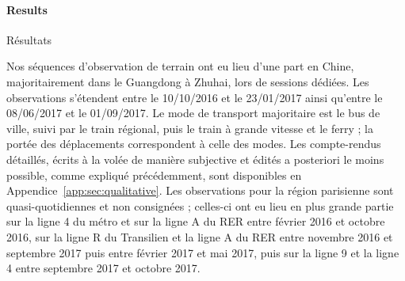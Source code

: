 \paragraph{Results}{Résultats}

Nos séquences d'observation de terrain ont eu lieu d'une part en Chine, majoritairement dans le Guangdong à Zhuhai, lors de sessions dédiées. Les observations s'étendent entre le 10/10/2016 et le 23/01/2017 ainsi qu'entre le 08/06/2017 et le 01/09/2017. Le mode de transport majoritaire est le bus de ville, suivi par le train régional, puis le train à grande vitesse et le ferry ; la portée des déplacements correspondent à celle des modes. Les compte-rendus détaillés, écrits à la volée de manière subjective et édités a posteriori le moins possible, comme expliqué précédemment, sont disponibles en Appendice~\ref{app:sec:qualitative}. Les observations pour la région parisienne sont quasi-quotidiennes et non consignées ; celles-ci ont eu lieu en plus grande partie sur la ligne 4 du métro et sur la ligne A du RER entre février 2016 et octobre 2016, sur la ligne R du Transilien et la ligne A du RER entre novembre 2016 et septembre 2017 puis entre février 2017 et mai 2017, puis sur la ligne 9 et la ligne 4 entre septembre 2017 et octobre 2017.




